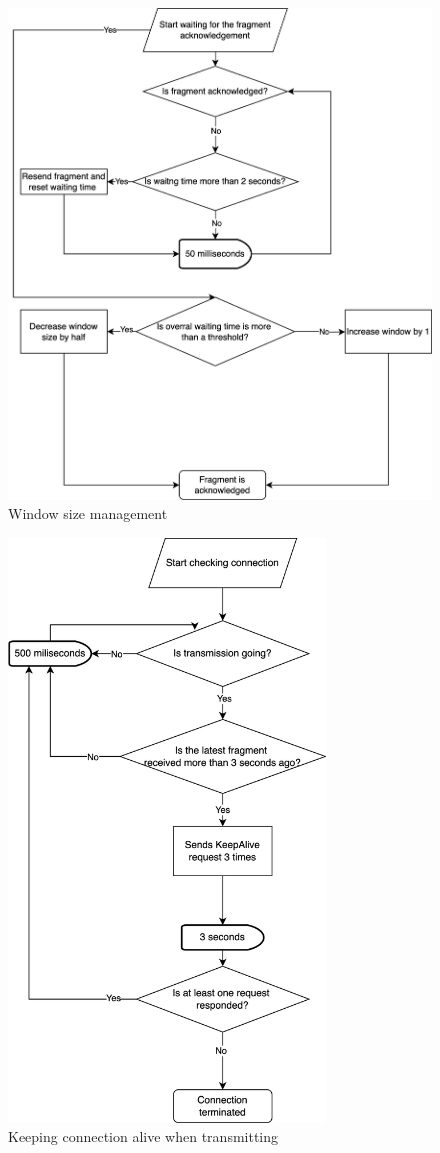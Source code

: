 \documentclass{article}
\begin{document}
\begin{figure}[!h]
    \centering
    \includegraphics[width=\textwidth]{images/windowmanage.png}
    \caption{Window size management}
    \label{fig:mesh2}
\end{figure}

\begin{figure}[!h]
    \centering
    \includegraphics[width=0.75\textwidth]{images/trkeepalive.png}
    \caption{Keeping connection alive when transmitting}
    \label{fig:mesh2}
\end{figure}
\end{document}
